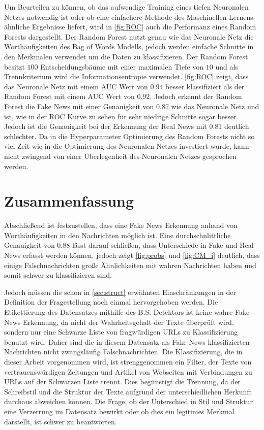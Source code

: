 Um Beurteilen zu können, ob das aufwendige Training eines tiefen Neuronalen Netzes notwendig ist oder ob eine einfachere
Methode des Maschinellen Lernens ähnliche Ergebnisse liefert, wird in \ref{fig:ROC} auch die Performanz eines 
Random Forests dargestellt. 
Der Random Forest nutzt genau wie das Neuronale Netz die Worthäufigkeiten des Bag of Words Modells, jedoch 
werden einfache Schnitte in den Merkmalen verwendet um die Daten zu klassifizieren.
Der Random Forest besitzt $100$ Entscheidungsbäume mit einer maximalen Tiefe von $10$ und als Trennkriterium wird die 
Informationsentropie verwendet.
\ref{fig:ROC} zeigt, dass das Neuronale Netz mit einem AUC Wert von $0.94$ besser klassifiziert als der Random Forest
mit einem AUC Wert von $0.92$.
Jedoch erkennt der Random Forest die Fake News mit einer Genauigkeit von $0.87$ wie das Neuronale Netz und ist, wie 
in der ROC Kurve zu sehen für sehr niedrige Schnitte sogar besser.
Jedoch ist die Genauigkeit bei der Erkennung der Real News mit $0.81$ deutlich schlechter. 
Da in die Hyperparameter Optimierung des Random Forests nicht so viel Zeit wie in die Optimierung des Neuronalen 
Netzes investiert wurde, kann nicht zwingend von einer Überlegenheit des Neuronalen Netzes gesprochen werden.

\chapter{Zusammenfassung}

Abschließend ist festzustellen, dass eine Fake News Erkennung anhand von Worthäufigkeiten in den Nachrichten möglich 
ist.
Eine durchschnlittliche Genauigkeit von $0.88$ lässt darauf schließen, dass Unterschiede in Fake und Real News erfasst
werden können, jedoch zeigt \ref{fig:probs} und \ref{fig:CM_i} deutlich, dass einige Falschnachrichten große 
Ähnlichkeiten mit wahren Nachrichten haben und somit schwer zu klassifizieren sind.

Jedoch müssen die schon in \ref{sec:struct} erwähnten Einschränkungen in der Definition der Fragestellung noch einmal 
hervorgehoben werden.
Die Etikettierung des Datensatzes mithilfe des B.S. Detektors ist keine wahre Fake News Erkennung, da nicht der 
Wahrheitsgehalt der Texte überprüft wird, sondern nur eine Schwarze Liste von fragwürdigen URLs zu Klassifizierung 
benutzt wird.
Daher sind die in diesem Datensatz als Fake News klassifizierten Nachrichten nicht zwangsläufig Falschnachrichten. 
Die Klassifizierung, die in dieser Arbeit vorgenommen wird, ist strenggenommen ein Filter, der Texte von 
vertrauenswürdigen Zeitungen und Artikel von Webseiten mit Verbindungen zu URLs auf der Schwarzen Liste trennt.
Dies begünstigt die Trennung, da der Schreibstil und die Struktur der Texte aufgrund der unterschiedlichen Herkunft 
durchaus abweichen können. 
Die Frage, ob der Unterschied in Stil und Struktur eine Verzerrung im Datensatz bewirkt oder ob dies ein 
legitimes Merkmal darstellt, ist schwer zu beantworten.

